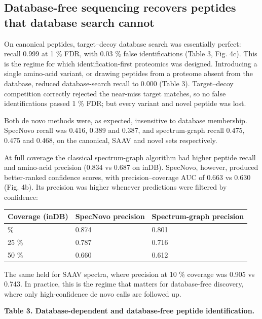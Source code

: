 \documentclass[
]{article}
\begin{document}
\hypertarget{database-free-sequencing-recovers-peptides-that-database-search-cannot}{%
\subsection{Database-free sequencing recovers peptides that database
search
cannot}\label{database-free-sequencing-recovers-peptides-that-database-search-cannot}}

On canonical peptides, target--decoy database search was essentially
perfect: recall 0.999 at 1 \% FDR, with 0.03 \% false identifications
(Table 3, Fig. 4c). This is the regime for which identification-first
proteomics was designed. Introducing a single amino-acid variant, or
drawing peptides from a proteome absent from the database, reduced
database-search recall to 0.000 (Table 3). Target--decoy competition
correctly rejected the near-miss target matches, so no false
identifications passed 1 \% FDR; but every variant and novel peptide was
lost.

Both de novo methods were, as expected, insensitive to database
membership. SpecNovo recall was 0.416, 0.389 and 0.387, and
spectrum-graph recall 0.475, 0.475 and 0.468, on the canonical, SAAV and
novel sets respectively.

At full coverage the classical spectrum-graph algorithm had higher
peptide recall and amino-acid precision (0.834 vs 0.687 on inDB).
SpecNovo, however, produced better-ranked confidence scores, with
precision--coverage AUC of 0.663 vs 0.630 (Fig. 4b). Its precision was
higher whenever predictions were filtered by confidence:

\begin{longtable}[]{@{}lll@{}}
\toprule\noalign{}
Coverage (inDB) & SpecNovo precision & Spectrum-graph precision \\
\midrule\noalign{}
\endhead
\bottomrule\noalign{}
\endlastfoot
10 \% & 0.874 & 0.801 \\
25 \% & 0.787 & 0.716 \\
50 \% & 0.660 & 0.612 \\
\end{longtable}

The same held for SAAV spectra, where precision at 10 \% coverage was
0.905 vs 0.743. In practice, this is the regime that matters for
database-free discovery, where only high-confidence de novo calls are
followed up.

\textbf{Table 3. Database-dependent and database-free peptide
identification.}
\end{document}
